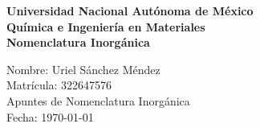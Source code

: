 \documentclass[12pt]{article}
\begin{document}
\begin{titlepage}
\thispagestyle{empty}
\begin{center}
\vspace*{2cm}
\fontsize{14}{30}\selectfont\textbf{Universidad Nacional Autónoma de México} \\
\vspace{1cm}
\fontsize{14}{30}\selectfont\textbf{Química e Ingeniería en Materiales} \\
\vspace{1cm}
\fontsize{14}{30}\selectfont\textbf{Nomenclatura Inorgánica} \\
\end{center}
\vspace{2cm}
\begin{flushright}
    \fontsize{14}{30}\selectfont
        \hspace{2cm} Nombre: Uriel Sánchez Méndez \\
        \hspace{2cm} Matrícula: 322647576 \\
        \hspace{2cm} Apuntes de Nomenclatura Inorgánica \\
        \hspace{2cm} Fecha: \today \\
\end{flushright}
\end{titlepage}

\tableofcontents
\thispagestyle{empty}
\newpage



\end{document}
